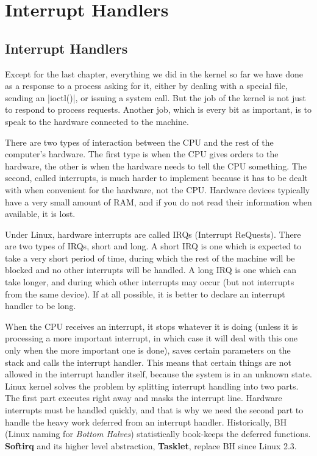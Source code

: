 \documentclass[10pt, oneside]{book}
\begin{document}
\section{Interrupt Handlers}
\label{sec:interrupt_handler}
\subsection{Interrupt Handlers}
\label{sec:irq}
Except for the last chapter, everything we did in the kernel so far we have done as a response to a process asking for it, either by dealing with a special file, sending an \cpp|ioctl()|, or issuing a system call.
But the job of the kernel is not just to respond to process requests.
Another job, which is every bit as important, is to speak to the hardware connected to the machine.

There are two types of interaction between the CPU and the rest of the computer's hardware.
The first type is when the CPU gives orders to the hardware, the other is when the hardware needs to tell the CPU something.
The second, called interrupts, is much harder to implement because it has to be dealt with when convenient for the hardware, not the CPU.
Hardware devices typically have a very small amount of RAM, and if you do not read their information when available, it is lost.

Under Linux, hardware interrupts are called IRQs (Interrupt ReQuests).
There are two types of IRQs, short and long.
A short IRQ is one which is expected to take a very short period of time, during which the rest of the machine will be blocked and no other interrupts will be handled.
A long IRQ is one which can take longer, and during which other interrupts may occur (but not interrupts from the same device).
If at all possible, it is better to declare an interrupt handler to be long.

When the CPU receives an interrupt, it stops whatever it is doing (unless it is processing a more important interrupt, in which case it will deal with this one only when the more important one is done),
saves certain parameters on the stack and calls the interrupt handler.
This means that certain things are not allowed in the interrupt handler itself, because the system is in an unknown state.
Linux kernel solves the problem by splitting interrupt handling into two parts.
The first part executes right away and masks the interrupt line.
Hardware interrupts must be handled quickly, and that is why we need the second part to handle the heavy work deferred from an interrupt handler.
Historically, BH (Linux naming for \textit{Bottom Halves}) statistically book-keeps the deferred functions.
\textbf{Softirq} and its higher level abstraction, \textbf{Tasklet}, replace BH since Linux 2.3.
\end{document}
